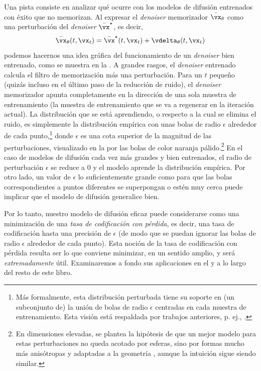 \documentclass[../../book-main.tex]{subfiles}
\begin{document}
Una pista consiste en analizar qué ocurre con los modelos de difusión
entrenados con éxito que no memorizan. Al expresar el \textit{denoiser} memorizador
\(\bar{\vx}_{\theta}\) como una perturbación del \textit{denoiser}
\(\bar{\vx}^{\star}\), es decir,
\begin{equation}
    \bar{\vx}_{\theta}(t, \vx_{t}) = \bar{\vx}^{\star}(t, \vx_{t}) +
    \vdelta_{\theta}(t, \vx_{t})
\end{equation}
podemos hacernos una idea gráfica del funcionamiento de un \textit{denoiser} bien entrenado,
como se muestra en la . A grandes rasgos,
el \textit{denoiser} entrenado calcula el filtro de memorización más una
perturbación. Para un \(t\) pequeño (quizás incluso en el último paso de la
reducción de ruido), el \textit{denoiser} memorizador apunta completamente en la dirección
de una sola muestra de entrenamiento (la muestra de entrenamiento que se va a regenerar
en la iteración actual). La distribución que se está aprendiendo, o respecto a la cual se elimina el ruido,
es simplemente la distribución empírica con unas
bolas de radio \(\epsilon\) alrededor de cada punto,\footnote{Más formalmente, esta
    distribución perturbada tiene su soporte en (un subconjunto de) la unión de
    bolas de radio \(\epsilon\) centradas en cada muestra de entrenamiento. Esta visión está
respaldada por trabajos anteriores, p. ej., \cite{song2025selective}.} donde
\(\epsilon\) es una cota superior de la magnitud de las perturbaciones,
visualizado en la  por las bolas de color naranja 
pálido.\footnote{En dimensiones elevadas, se plantea la hipótesis de que un mejor
    modelo para estas perturbaciones no queda acotado por esferas, sino 
    por formas mucho más anisótropas y adaptadas a la geometría
\cite{farghly2025diffusion}, aunque la intuición sigue siendo similar.} En el caso de
modelos de difusión cada vez más grandes y bien entrenados, el
radio de perturbación \(\epsilon\) se reduce a \(0\) y el modelo
aprende la distribución empírica. Por otro lado, un valor de \(\epsilon\)
lo suficientemente grande como para que las bolas correspondientes a puntos diferentes se superpongan
o estén muy cerca puede implicar que el modelo de difusión generalice bien.

Por lo tanto, nuestro modelo de difusión eficaz puede considerarse como una minimización de una
\textit{tasa de codificación con pérdida}, es decir, una tasa de codificación hasta una precisión
de \(\epsilon\) (de modo que se puedan ignorar las bolas de radio \(\epsilon\)
alrededor de cada punto). Esta noción de la tasa de codificación con pérdida resulta ser
lo que conviene minimizar, en un sentido amplio, y será
\textit{extremadamente} útil. Examinaremos a fondo sus aplicaciones en el
 y a lo largo del resto de este libro.
\end{document}
